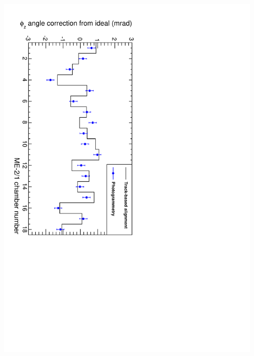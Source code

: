 \documentclass[compress]{beamer}
\begin{document}
\begin{frame}
\begin{columns}
\includegraphics[height=0.95\linewidth, angle=90]{compare_m21_phiz.pdf}
\end{columns}

\end{frame}
\end{document}
